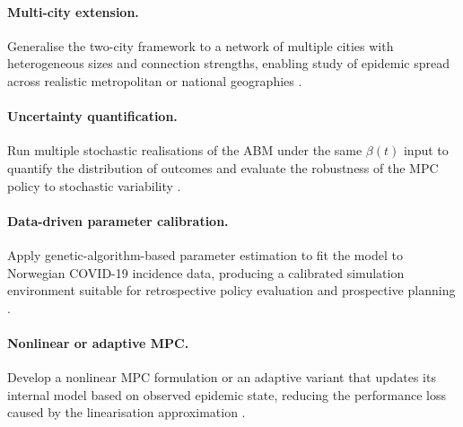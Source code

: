 \paragraph{Multi-city extension.}
Generalise the two-city framework to a network of multiple cities with heterogeneous sizes and connection strengths, enabling study of epidemic spread across realistic metropolitan or national geographies \citep{carli2020}.

\paragraph{Uncertainty quantification.}
Run multiple stochastic realisations of the ABM under the same $\beta(t)$ input to quantify the distribution of outcomes and evaluate the robustness of the MPC policy to stochastic variability \citep{peak2017}.

\paragraph{Data-driven parameter calibration.}
Apply genetic-algorithm-based parameter estimation \citep{rajaei2021} to fit the model to Norwegian COVID-19 incidence data, producing a calibrated simulation environment suitable for retrospective policy evaluation and prospective planning \citep{ariyaratne2025,dong2022}.

\paragraph{Nonlinear or adaptive MPC.}
Develop a nonlinear MPC formulation or an adaptive variant that updates its internal model based on observed epidemic state, reducing the performance loss caused by the linearisation approximation \citep{morato2020,liu2021}.
